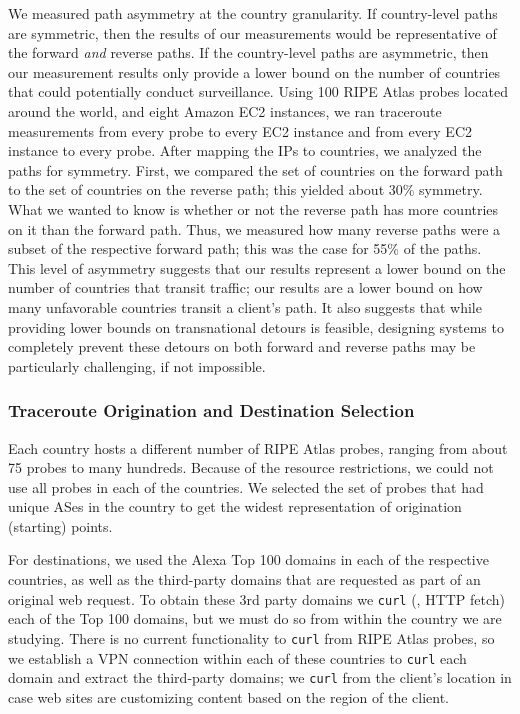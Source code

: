 We measured path asymmetry at the country
granularity. If country-level paths are symmetric, then the results of
our measurements would be representative of the forward {\it and}
reverse paths. If the country-level paths are asymmetric, then our
measurement results only provide a lower bound on the number of countries
that could potentially conduct surveillance.  Using 100 RIPE Atlas
probes located around the world, and eight Amazon EC2 instances, we ran
traceroute measurements from every probe to every EC2 instance and from
every EC2 instance to every probe.  After mapping the IPs to countries,
we analyzed the paths for symmetry.  First, we compared the set of
countries on the forward path to the set of countries on the reverse
path; this yielded about 30\% symmetry.  What we wanted to know is
whether or not the reverse path has more countries on it than the
forward path.  Thus, we measured how many reverse paths were a subset of the
respective forward path; this was the case for 55\% of the paths.   
This level of asymmetry suggests that our results represent a lower
bound on the number of countries that transit traffic; our results are a
lower bound on how many unfavorable countries transit a client's
path. It also suggests that while providing lower bounds on
transnational detours is feasible, designing systems to completely
prevent these detours on both forward and reverse paths may be particularly
challenging, if not impossible. 

\subsubsection{Traceroute Origination and Destination Selection}

Each country hosts a different number of RIPE Atlas probes, ranging
from about 75 probes to many hundreds.  Because of the resource
restrictions, we could not use all probes in each of the countries.  We
selected the set of probes that had unique ASes in the country to get
the widest representation of origination (starting) points.

For destinations, we used the Alexa Top 100 domains in each of the
respective countries, as well as the third-party domains that are
requested as part of an original web request.  To obtain these 3rd party
domains we {\tt curl} (\ie, HTTP fetch) each of the Top 100 domains, but we must
do so from within the country we are studying.  There is no current
functionality to {\tt curl} from RIPE Atlas probes, so we establish a
VPN connection within each of these countries to {\tt curl} each domain
and extract the third-party domains; we {\tt curl} from the client's
location in case web sites are customizing content based on the region
of the client. 

